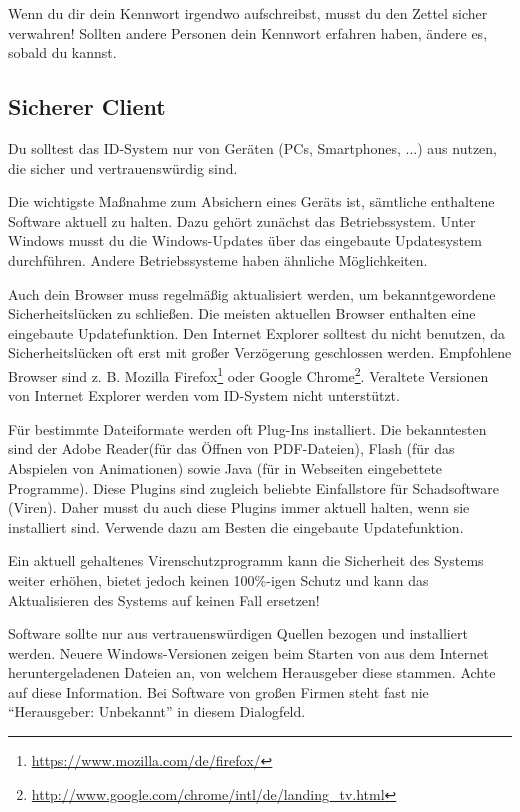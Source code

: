 Wenn du dir dein Kennwort irgendwo aufschreibst, musst du den Zettel sicher verwahren!
Sollten andere Personen dein Kennwort erfahren haben, ändere es, sobald du kannst.

\subsection{Sicherer Client}
Du solltest das ID-System nur von Geräten (PCs, Smartphones, ...) aus nutzen, die sicher und vertrauenswürdig sind.

Die wichtigste Maßnahme zum Absichern eines Geräts ist, sämtliche enthaltene Software aktuell zu halten.
Dazu gehört zunächst das Betriebssystem.
Unter Windows musst du die Windows-Updates über das eingebaute Updatesystem durchführen. Andere Betriebssysteme haben ähnliche Möglichkeiten.

Auch dein Browser muss regelmäßig aktualisiert werden, um bekanntgewordene Sicherheitslücken zu schließen.
Die meisten aktuellen Browser enthalten eine eingebaute Updatefunktion.
Den Internet Explorer solltest du nicht benutzen, da Sicherheitslücken oft erst mit großer Verzögerung geschlossen werden.
Empfohlene Browser sind z. B. Mozilla Firefox\footnote{\url{https://www.mozilla.com/de/firefox/}}
oder Google Chrome\footnote{\url{http://www.google.com/chrome/intl/de/landing_tv.html}}.
Veraltete Versionen von Internet Explorer werden vom ID-System nicht unterstützt.

Für bestimmte Dateiformate werden oft Plug-Ins installiert.
Die bekanntesten sind der Adobe Reader(für das Öffnen von PDF-Dateien),
Flash (für das Abspielen von Animationen) sowie
Java (für in Webseiten eingebettete Programme).
Diese Plugins sind zugleich beliebte Einfallstore für Schadsoftware (Viren).
Daher musst du auch diese Plugins immer aktuell halten, wenn sie installiert sind.
Verwende dazu am Besten die eingebaute Updatefunktion.

Ein aktuell gehaltenes Virenschutzprogramm kann die Sicherheit des Systems weiter erhöhen,
bietet jedoch keinen 100\%-igen Schutz und kann das Aktualisieren des Systems auf keinen Fall ersetzen!

Software sollte nur aus vertrauenswürdigen Quellen bezogen und installiert werden.
Neuere Windows-Versionen zeigen beim Starten von aus dem Internet heruntergeladenen Dateien an, von welchem Herausgeber diese stammen.
Achte auf diese Information. Bei Software von großen Firmen steht fast nie "`Herausgeber: Unbekannt"' in diesem Dialogfeld.


